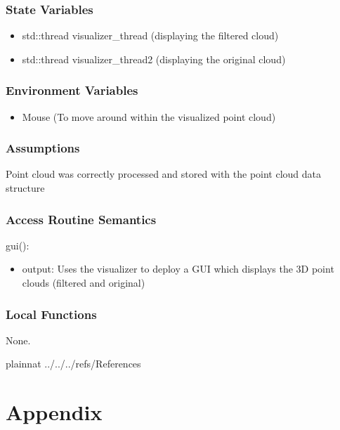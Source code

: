 \documentclass[12pt, titlepage]{article}
\begin{document}
\subsubsection{State Variables}

\begin{itemize}
  \item std::thread visualizer\_thread (displaying the filtered cloud)
  \item std::thread visualizer\_thread2 (displaying the original cloud)
\end{itemize}

\subsubsection{Environment Variables}

\begin{itemize}
  \item Mouse (To move around within the visualized point cloud)
\end{itemize}

\subsubsection{Assumptions}

Point cloud was correctly processed and stored with the point cloud data structure


\subsubsection{Access Routine Semantics}

\noindent gui():
\begin{itemize}
\item output: Uses the visualizer to deploy a GUI which displays the 3D point clouds (filtered and original)
\end{itemize}

\subsubsection{Local Functions}

None.

\newpage

 {plainnat}
 {../../../refs/References}

\newpage

\section{Appendix} \label{Appendix}
\end{document}
